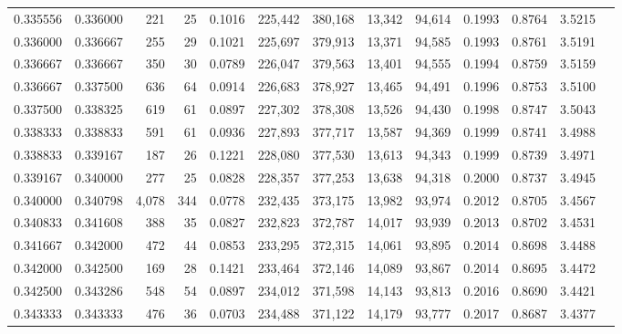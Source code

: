 \begin{tabular}{rrrrrrrrrrrrr}
0.335556 & 0.336000 &   221 &  25 &                                     0.1016 & 225,442 & 380,168 &  13,342 &  94,614 & 0.1993 & 0.8764 & 3.5215 \\
0.336000 & 0.336667 &   255 &  29 &                                     0.1021 & 225,697 & 379,913 &  13,371 &  94,585 & 0.1993 & 0.8761 & 3.5191 \\
0.336667 & 0.336667 &   350 &  30 &                                     0.0789 & 226,047 & 379,563 &  13,401 &  94,555 & 0.1994 & 0.8759 & 3.5159 \\
0.336667 & 0.337500 &   636 &  64 &                                     0.0914 & 226,683 & 378,927 &  13,465 &  94,491 & 0.1996 & 0.8753 & 3.5100 \\
0.337500 & 0.338325 &   619 &  61 &                                     0.0897 & 227,302 & 378,308 &  13,526 &  94,430 & 0.1998 & 0.8747 & 3.5043 \\
0.338333 & 0.338833 &   591 &  61 &                                     0.0936 & 227,893 & 377,717 &  13,587 &  94,369 & 0.1999 & 0.8741 & 3.4988 \\
0.338833 & 0.339167 &   187 &  26 &                                     0.1221 & 228,080 & 377,530 &  13,613 &  94,343 & 0.1999 & 0.8739 & 3.4971 \\
0.339167 & 0.340000 &   277 &  25 &                                     0.0828 & 228,357 & 377,253 &  13,638 &  94,318 & 0.2000 & 0.8737 & 3.4945 \\
0.340000 & 0.340798 & 4,078 & 344 &                                     0.0778 & 232,435 & 373,175 &  13,982 &  93,974 & 0.2012 & 0.8705 & 3.4567 \\
0.340833 & 0.341608 &   388 &  35 &                                     0.0827 & 232,823 & 372,787 &  14,017 &  93,939 & 0.2013 & 0.8702 & 3.4531 \\
0.341667 & 0.342000 &   472 &  44 &                                     0.0853 & 233,295 & 372,315 &  14,061 &  93,895 & 0.2014 & 0.8698 & 3.4488 \\
0.342000 & 0.342500 &   169 &  28 &                                     0.1421 & 233,464 & 372,146 &  14,089 &  93,867 & 0.2014 & 0.8695 & 3.4472 \\
0.342500 & 0.343286 &   548 &  54 &                                     0.0897 & 234,012 & 371,598 &  14,143 &  93,813 & 0.2016 & 0.8690 & 3.4421 \\
0.343333 & 0.343333 &   476 &  36 &                                     0.0703 & 234,488 & 371,122 &  14,179 &  93,777 & 0.2017 & 0.8687 & 3.4377 \\

\end{tabular}
